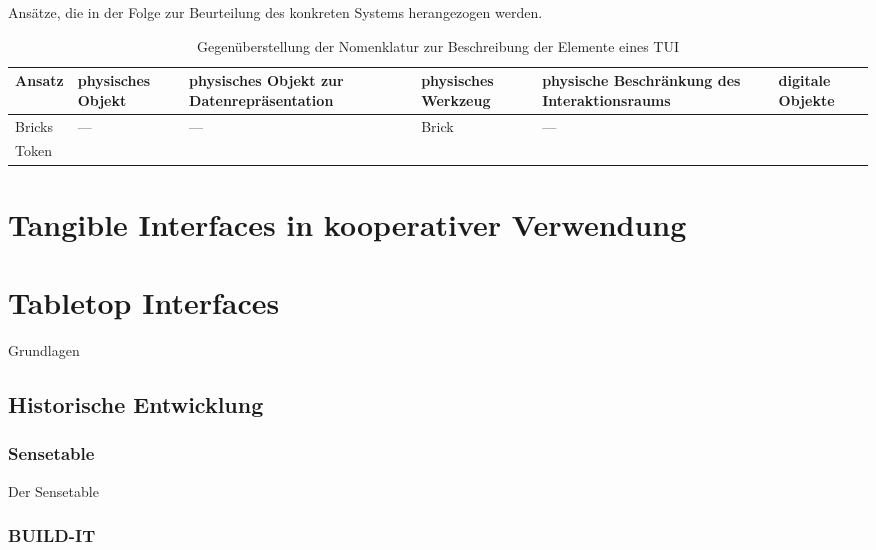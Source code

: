 Ansätze, die in der Folge zur Beurteilung des konkreten Systems herangezogen werden.

\begin{table}[htbp]
	\centering
	\caption{Gegenüberstellung der Nomenklatur zur Beschreibung der Elemente eines TUI}
	\begin{tabular}{| p{3cm} || p{2cm} | p{2cm} | p{2cm} | p{2cm} | p{2cm} |} \hline
		Ansatz & physisches Objekt & physisches Objekt zur Daten\-repräsentation & physisches Werkzeug & physische Beschränkung des Interaktionsraums & digitale Objekte \\ \hline \hline
		Bricks & --- & --- & Brick & --- \\ \hline
		Token
	\end{tabular}
	\label{tab:tui_nomenklatur}
\end{table}



\section{Tangible Interfaces in kooperativer Verwendung} %
\label{sub:tangible_interfaces_in_kooperativer_verwendung}
\citep{Hornecker04}


\section{Tabletop Interfaces} %
\label{sec:tabletop_interfaces}

Grundlagen

\subsection{Historische Entwicklung} %
\label{sub:historische_entwicklung_von_tabletop_interfaces}

\subsubsection{Sensetable} %
\label{subs:sensetable}
Der Sensetable \citep{Patten01}

\subsubsection{BUILD-IT} %
\label{par:build_it}
\citep{Fjeld01}

